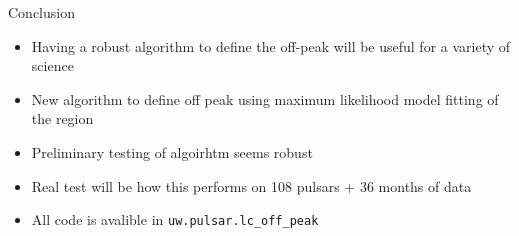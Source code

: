 \documentclass[12pt]{beamer}
\begin{document}
\begin{frame}{Conclusion}
  \begin{itemize}
    \item Having a robust algorithm to define the off-peak will
      be useful for a variety of science
    \item New algorithm to define off peak using maximum likelihood
      model fitting of the region
    \item Preliminary testing of algoirhtm seems robust
  \item Real test will be how this performs on 108 pulsars + 36 months of data
  \item All code is avalible in \texttt{uw.pulsar.lc\_off\_peak}
  \end{itemize}
\end{frame}
\end{document}
